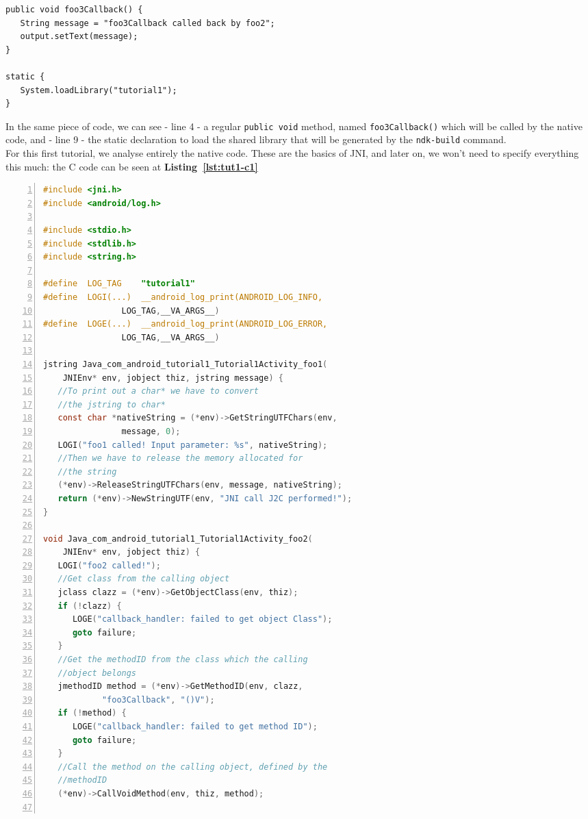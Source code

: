 \documentclass[a4paper,10pt]{article}
\newcommand{\keyword}[1]{\texttt{#1}}
\newcommand{\refl}[1]{\textbf{Listing~\ref{#1}}}
\begin{document}
\begin{multicols}{2}
\begin{lstlisting}
public void foo3Callback() {
   String message = "foo3Callback called back by foo2";
   output.setText(message);
}
  
static {
   System.loadLibrary("tutorial1");
}
\end{lstlisting}
In the same piece of code, we can see - line 4 - a regular \keyword{public void}
method, named \keyword{foo3Callback()} which will be called by the native code,
and - line 9 - the static declaration to load the shared library that will be
generated by the \keyword{ndk-build} command.\\
For this first tutorial, we analyse entirely the native code. These are the
basics of JNI, and later on, we won't need to specify everything this much: the
C code can be seen at \refl{lst:tut1-c1}

\begin{lstlisting}[language=C,
		   columns=fullflexible,
		   showstringspaces=false,
		   xleftmargin=15pt,
		   frame = l,
		   numbers=left,
		   commentstyle=\color{gray}\upshape,
		   caption=tutorial1.c,
		   label=lst:tut1-c1]
#include <jni.h>
#include <android/log.h>

#include <stdio.h>
#include <stdlib.h>
#include <string.h>

#define  LOG_TAG    "tutorial1"
#define  LOGI(...)  __android_log_print(ANDROID_LOG_INFO,
				LOG_TAG,__VA_ARGS__)
#define  LOGE(...)  __android_log_print(ANDROID_LOG_ERROR,
				LOG_TAG,__VA_ARGS__)

jstring Java_com_android_tutorial1_Tutorial1Activity_foo1(
	JNIEnv* env, jobject thiz, jstring message) {
   //To print out a char* we have to convert
   //the jstring to char*
   const char *nativeString = (*env)->GetStringUTFChars(env,
				message, 0);
   LOGI("foo1 called! Input parameter: %s", nativeString);
   //Then we have to release the memory allocated for
   //the string
   (*env)->ReleaseStringUTFChars(env, message, nativeString);
   return (*env)->NewStringUTF(env, "JNI call J2C performed!");
}

void Java_com_android_tutorial1_Tutorial1Activity_foo2(
	JNIEnv* env, jobject thiz) {
   LOGI("foo2 called!");
   //Get class from the calling object
   jclass clazz = (*env)->GetObjectClass(env, thiz);
   if (!clazz) {
      LOGE("callback_handler: failed to get object Class");
      goto failure;
   }
   //Get the methodID from the class which the calling
   //object belongs
   jmethodID method = (*env)->GetMethodID(env, clazz,
   			"foo3Callback", "()V");
   if (!method) {
      LOGE("callback_handler: failed to get method ID");
      goto failure;
   }
   //Call the method on the calling object, defined by the
   //methodID
   (*env)->CallVoidMethod(env, thiz, method);


\end{lstlisting}
\end{multicols}
\end{document}
